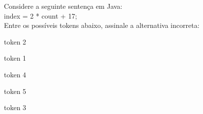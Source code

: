 \question[10]

Considere a seguinte sentença em Java:\\
index = 2 * count + 17;\\
Entre os possíveis tokens abaixo, assinale a alternativa incorreta:\\
\begin{choices}
\item token 2
\item token 1 
\item token 4
\item token 5 %
\item token 3 
\end{choices}
\answerline


